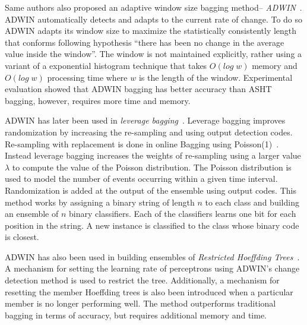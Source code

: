 Same authors also proposed an adaptive window size bagging method-- \textit{ADWIN}~\cite{bifet09:asht}. ADWIN automatically detects and adapts to the current rate of change. To do so ADWIN adapts its window size to maximize the statistically consistently length that conforms following hypothesis ``there has been no change in the average value inside the window''. The window is not maintained explicitly, rather using a variant of a exponential histogram technique that takes $O(log\;w)$ memory and $O(log\;w)$ processing time where $w$ is the length of the window. Experimental evaluation showed that ADWIN bagging has better accuracy than ASHT bagging, however, requires more time and memory. 

ADWIN has later been used in \textit{leverage bagging}~\cite{bifet10:levbag}. Leverage bagging improves randomization by increasing the re-sampling and using output detection codes. Re-sampling with replacement is done in online Bagging using Poisson(1)~\cite{oza01:obagboost}. Instead leverage bagging increases the weights of re-sampling using a larger value $\lambda$ to compute the value of the Poisson distribution. The Poisson distribution is used to model the number of events occurring within a given time interval. Randomization is added at the output of the ensemble using output codes. This method works by assigning a binary string of length $n$ to each class and building an ensemble of $n$ binary classifiers. Each of the classifiers learns one bit for each position in the string. A new instance is classified to the class whose binary code is closest. 

ADWIN has also been used in building ensembles of \textit{Restricted Hoeffding Trees}~\cite{bifet10:rht}. A mechanism for setting the learning rate of perceptrons using ADWIN's change detection method is used to restrict the tree. Additionally, a mechanism for resetting the member Hoeffding trees is also been introduced when a particular member is no longer performing well. The method outperforms traditional bagging in terms of accuracy, but requires additional memory and time.

